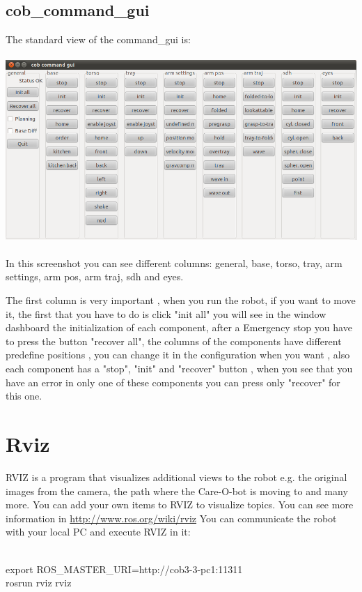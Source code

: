 \subsection{cob\_command\_gui}
The standard view of the command\_gui is:
\\
\\
 \includegraphics[width=1\textwidth]{images/cob_command_gui.png}
\\
\\
In this screenshot you can see different columns:  general, base, torso, tray, arm settings, arm pos, arm traj, sdh and eyes.

The first column is very important , when you run the robot, if you want to move it, the first that you have to do is click "init all" you will see in the window dashboard the initialization of each component, after a Emergency stop you have to press the button "recover all", the columns of the components have different predefine positions , you can change it in the configuration when you want , also each component has a "stop", "init" and "recover" button , when you see that you have an error in only one of these components you can press only "recover" for this one.

\section{Rviz}
RVIZ is a program that visualizes additional views to the robot e.g. the original images from the camera, the path where the Care-O-bot is moving to and many more. You can add your own items to RVIZ to visualize topics. You can see more information in \url{http://www.ros.org/wiki/rviz}
You can communicate the robot with your local PC and execute RVIZ in it:
\\
\\   \colorbox{light-gray}{
         \begin{minipage}{1.0\textwidth} 
		export ROS\_MASTER\_URI=http://cob3-3-pc1:11311
		\\rosrun rviz rviz
         \end{minipage}  } \\
	\\


